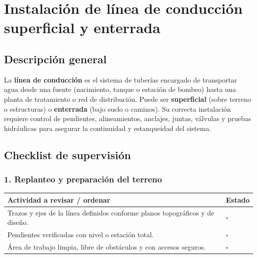 \documentclass[12pt]{article}
\newcommand{\cbox}{\(\square\)} %
\begin{document}
	
	
	
	
			
	\section{Instalación de línea de conducción superficial y enterrada}
	
	\subsection*{Descripción general}
	La \textbf{línea de conducción} es el sistema de tuberías encargado de transportar agua desde una fuente (nacimiento, tanque o estación de bombeo) hasta una planta de tratamiento o red de distribución.  
	Puede ser \textbf{superficial} (sobre terreno o estructuras) o \textbf{enterrada} (bajo suelo o caminos). Su correcta instalación requiere control de pendientes, alineamientos, anclajes, juntas, válvulas y pruebas hidráulicas para asegurar la continuidad y estanqueidad del sistema.
	

	
	\subsection{Checklist de supervisión}
	
	\subsubsection*{1. Replanteo y preparación del terreno}
	\begin{tabularx}{\linewidth}{>{\raggedright\arraybackslash}p{0.93\linewidth} >{\centering\arraybackslash}m{0.07\linewidth}}
		\toprule
		\textbf{Actividad a revisar / ordenar} & \textbf{Estado}\\
		\midrule
		Trazos y ejes de la línea definidos conforme planos topográficos y de diseño. & \cbox \\
		Pendientes verificadas con nivel o estación total. & \cbox \\
		Área de trabajo limpia, libre de obstáculos y con accesos seguros. & \cbox \\
		\bottomrule
	\end{tabularx}
	
\end{document}
